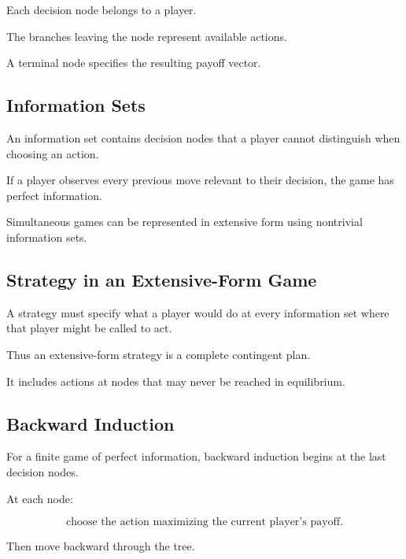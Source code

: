 Each decision node belongs to a player.

The branches leaving the node represent available actions.

A terminal node specifies the resulting payoff vector.

\subsection{Information Sets}
\label{subsec:information-sets}

An information set contains decision nodes that a player cannot distinguish
when choosing an action.

If a player observes every previous move relevant to their decision, the
game has perfect information.

Simultaneous games can be represented in extensive form using nontrivial
information sets.

\subsection{Strategy in an Extensive-Form Game}
\label{subsec:extensive-form-strategy}

A strategy must specify what a player would do at every information set
where that player might be called to act.

Thus an extensive-form strategy is a complete contingent plan.

It includes actions at nodes that may never be reached in equilibrium.

\subsection{Backward Induction}
\label{subsec:game-backward-induction}

For a finite game of perfect information, backward induction begins at the
last decision nodes.

At each node:

\[
\boxed{
\text{choose the action maximizing the current player's payoff}.
}
\]

Then move backward through the tree.

